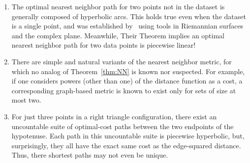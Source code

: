 \begin{enumerate}

\item The optimal nearest neighbor path for two points not in the dataset
is generally composed of hyperbolic arcs.
This holds true even when the dataset is a single point, and was established by~\cite{cohen15approximating} using tools in Riemannian surfaces and the complex plane.
Meanwhile, Their Theorem implies an optimal nearest neighbor path for two data points is piecewise linear!

\item There are simple and natural variants of the nearest neighbor metric, for which no analog of Theorem~\ref{thm:NN} is known nor suspected.
For example, if one considers powers (other than one) of the distance function as a cost, a corresponding graph-based metric is known to exist only for sets of size at most two.

\item For just three points in a right triangle configuration, there exist an uncountable suite of optimal-cost paths between the two endpoints of the hypotenuse.
Each path in this uncountable suite is piecewise hyperbolic, but, surprisingly, they all have the exact same cost as the edge-squared distance.
Thus, there shortest paths may not even be unique.


\end{enumerate}
